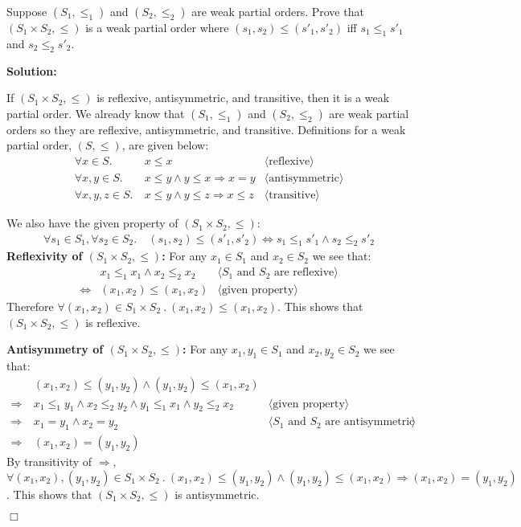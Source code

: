 \documentclass[11pt,fleqn]{article}
\newcommand{\sglsp}{\ }
\newenvironment{proof}{\par\noindent{\bf Proof\sglsp}}{\hfill$\Box$}
\newcommand{\pnote}[1]{{\langle \text{#1} \rangle}}
\begin{document}
  \item Suppose $(S_1,\le_1)$ and $(S_2,\le_2)$ are weak partial
    orders.  Prove that $(S_1 \times S_2, \le)$ is a weak partial
    order where $(s_1,s_2) \le (s'_1,s'_2)$ iff $s_1 \le_1 s'_1$ and
    $s_2 \le_2 s'_2$.
    
\medskip

\textbf{Solution:}

\medskip

\begin{proof}
	If $(S_1 \times S_2, \leq)$ is reflexive, antisymmetric, and transitive, then it is a weak partial order.
	We already know that $(S_1,\le_1)$ and $(S_2,\le_2)$ are weak partial orders so they are reflexive, antisymmetric, and transitive. Definitions for a weak partial order, $(S,\leq)$, are given below:
	\begin{align*}
		\forall x \in S.~		& x \leq x 										& \pnote{reflexive}\\
		\forall x,y	\in S.~		& x \leq y \wedge y \leq x \Rightarrow x=y 		& \pnote{antisymmetric}\\
		\forall x,y,z \in S.~ 	& x \leq y \wedge y \leq z \Rightarrow x \leq z 	& \pnote{transitive}
	\end{align*}
	
	We also have the given property of $(S_1 \times S_2, \leq)$:
	\begin{align*}
		\forall s_1 \in S_1, \forall s_2 \in S_2.~ 	& (s_1,s_2) \le (s'_1,s'_2) \iff s_1 \le_1 s'_1 \wedge s_2 \le_2 s'_2
	\end{align*}
	\medskip
	\textbf{Reflexivity of $(S_1 \times S_2, \leq)$:} For any $x_1 \in S_1$ and $x_2 \in S_2$ we see that:
	\begin{align*}
				& x_1 \le_1 x_1 \wedge x_2 \le_2 x_2 	& \pnote{$S_1$ and $S_2$ are reflexive}\\
		\iff	& (x_1,x_2) \le (x_1,x_2) 				& \pnote{given property}
	\end{align*}
	Therefore $\forall (x_1,x_2) \in S_1 \times S_2~.~(x_1,x_2) \le (x_1,x_2)$.
	This shows that $(S_1 \times S_2, \leq)$ is reflexive.

	\medskip
	\textbf{Antisymmetry of $(S_1 \times S_2, \leq)$:} For any $x_1,y_1 \in S_1$ and $x_2,y_2 \in S_2$ we see that:
	\begin{align*}
						& (x_1,x_2) \le (y_1,y_2) \wedge (y_1,y_2) \le (x_1,x_2) 						& \\
		\Rightarrow~	& x_1 \le_1 y_1 \wedge x_2 \le_2 y_2 \wedge y_1 \le_1 x_1 \wedge y_2 \le_2 x_2 	& \pnote{given property}\\
		\Rightarrow~	& x_1 = y_1 \wedge x_2 = y_2													& \pnote{$S_1$ and $S_2$ are antisymmetric}\\
		\Rightarrow~	& (x_1,x_2) = (y_1,y_2)															&
	\end{align*}
	By transitivity of $\Rightarrow$, $\forall (x_1,x_2),(y_1,y_2) \in S_1 \times S_2~.~(x_1,x_2) \le (y_1,y_2) \wedge (y_1,y_2) \le (x_1,x_2) \Rightarrow (x_1,x_2) = (y_1,y_2)$.
	This shows that $(S_1 \times S_2, \leq)$ is antisymmetric.


\end{proof}
\end{document}
